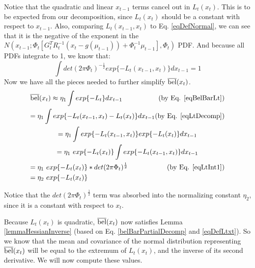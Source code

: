 Notice that the quadratic and linear \(x_{t-1}\) terms cancel out in \(L_t(x_t)\). This is to be expected from our decomposition, since \(L_t(x_t)\) should be a constant with respect to \(x_{t-1}\). Also, comparing \(L_t(x_{t-1},x_t)\) to Eq. \ref{eqDefNormal}, we can see that it is the negative of the exponent in the \(N(x_{t-1};\Phi_t [G_t^T R_t^{-1}  (x_t - g(\mu_{t-1})) + \Phi_t^{-1} \mu_{t-1}], \Phi_t)\) PDF. And because all PDFs integrate to 1, we know that:
\begin{equation} \label{eqLtInt1}
\int det(2 \pi \Phi_t)^{-\frac{1}{2}} exp\{-L_t(x_{t-1},x_t)\}dx_{t-1} = 1
\end{equation}
Now we have all the pieces needed to further simplify \(\overline{\mathrm{bel}}(x_t)\).
\begin{multline} \label{belBarPartialDecomp}
\overline{\bel}(x_t) \approx \eta_1 \int exp\{-L_t\}dx_{t-1} \hfill \text{(by Eq. \ref{eqBelBarLt})} \\
= \eta_1 \int exp\{-L_t(x_{t-1},x_t) - L_t(x_t)\}dx_{t-1} \hfill \text{(by Eq. \ref{eqLtDecomp})} \\
= \eta_1 \int exp\{-L_t(x_{t-1},x_t)\} exp \{ - L_t(x_t)\}dx_{t-1} \\
= \eta_1\ exp \{ - L_t(x_t)\} \int exp\{-L_t(x_{t-1},x_t)\} dx_{t-1} \\
= \eta_1\ exp \{ - L_t(x_t)\} * det(2 \pi \Phi_t)^{\frac{1}{2}} \hfill \text{(by Eq. \ref{eqLtInt1})} \\
= \eta_2\ exp \{ - L_t(x_t)\} \hfill
\end{multline}

Notice that the \(det(2 \pi \Phi_t)^{\frac{1}{2}}\) term was absorbed into the normalizing constant \(\eta_2\), since it is a constant with respect to \(x_t\).

Because \(L_t(x_t)\) is quadratic, \(\overline{\mathrm{bel}}(x_t)\) now satisfies Lemma \ref{lemmaHessianInverse} (based on Eq. \ref{belBarPartialDecomp} and \ref{eqDefLtxt}). So we know that the mean and covariance of the normal distribution representing \(\overline{\mathrm{bel}}(x_t)\) will be equal to the extremum of \(L_t(x_t)\), and the inverse of its second derivative. We will now compute these values.

